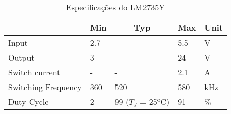 \begin{table}
\centering
\caption{Especificações do LM2735Y}
\label{lm2735_specs_table}
\begin{tabular}{|l|l|l|l|l|} 
\cline{2-5}
\multicolumn{1}{c|}{} & \multicolumn{1}{c|}{Min} & \multicolumn{1}{c|}{Typ} & \multicolumn{1}{c|}{Max} & Unit  \\ 
\hline
Input                 & 2.7                      & -                        & 5.5                      & V     \\ 
\hline
Output                & 3                        & -                        & 24                       & V   \\ 
\hline
Switch current                & -                        & -                        & 2.1                      & A   \\ 
\hline
Switching Frequency   & 360                        & 520                      & 580                        & kHz   \\
\hline
Duty Cycle   & 2                        & 99 ($T_{J}$ = 25ºC)                      & 91                        & \%   \\
\hline
\end{tabular}
\end{table}